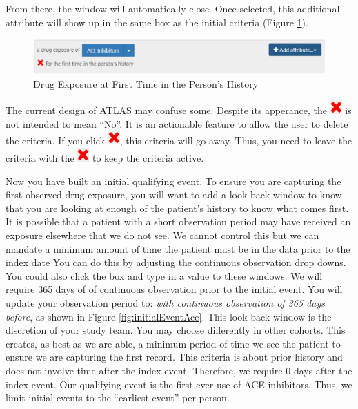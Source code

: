 \documentclass[11pt]{book}
\theoremstyle{definition}
\theoremstyle{definition}
\theoremstyle{definition}
\theoremstyle{remark}
\let\BeginKnitrBlock\begin \let\EndKnitrBlock\end
\begin{document}
From there, the window will automatically close. Once selected, this additional attribute will show up in the same box as the initial criteria (Figure \ref{fig:atlasfirsttimeever}).

\begin{figure}

{\centering \includegraphics[width=0.9\linewidth]{images/Cohorts/ATLAS-firsttimeever} 

}

\caption{Drug Exposure at First Time in the Person's History}\label{fig:atlasfirsttimeever}
\end{figure}

\BeginKnitrBlock{rmdimportant}
The current design of ATLAS may confuse some. Despite its apperance, the \includegraphics{images/Cohorts/redX.png} is not intended to mean ``No''. It is an actionable feature to allow the user to delete the criteria. If you click \includegraphics{images/Cohorts/redX.png}, this criteria will go away. Thus, you need to leave the criteria with the \includegraphics{images/Cohorts/redX.png} to keep the criteria active.
\EndKnitrBlock{rmdimportant}

Now you have built an initial qualifying event. To ensure you are capturing the first observed drug exposure, you will want to add a look-back window to know that you are looking at enough of the patient's history to know what comes first. It is possible that a patient with a short observation period may have received an exposure elsewhere that we do not see. We cannot control this but we can mandate a minimum amount of time the patient must be in the data prior to the index date You can do this by adjusting the continuous observation drop downs. You could also click the box and type in a value to these windows. We will require 365 days of of continuous observation prior to the initial event. You will update your observation period to: \emph{with continuous observation of 365 days before}, as shown in Figure \ref{fig:initialEventAce}. This look-back window is the discretion of your study team. You may choose differently in other cohorts. This creates, as best as we are able, a minimum period of time we see the patient to ensure we are capturing the first record. This criteria is about prior history and does not involve time after the index event. Therefore, we require 0 days after the index event. Our qualifying event is the first-ever use of ACE inhibitors. Thus, we limit initial events to the ``earliest event'' per person.
\end{document}
